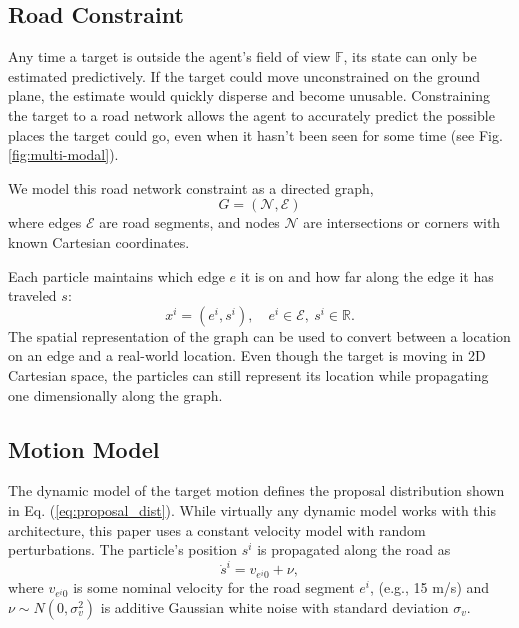 \documentclass[letterpaper, 10 pt, conference]{ieeeconf}  %
\begin{document}
\subsection{Road Constraint}

Any time a target is outside the agent's field of view $\mathbb{F}$, its state can only be estimated predictively. If the target could move unconstrained on the ground plane, the estimate would quickly disperse and become unusable. Constraining the target to a road network allows the agent to accurately predict the possible places the target could go, even when it hasn't been seen for some time (see Fig. \ref{fig:multi-modal}).

We model this road network constraint as a directed graph,
\begin{equation}%
    G = (\mathcal{N}, \mathcal{E})
\end{equation}
where edges $\mathcal{E}$ are road segments, and nodes $\mathcal{N}$ are intersections or corners with known Cartesian coordinates.

Each particle maintains which edge $e$ it is on and how far along the edge it has traveled $s$:
\begin{equation}%
    x^i = (e^i, s^i), \quad e^i \in \mathcal{E},\ s^i \in \mathbb{R}.
\end{equation}
The spatial representation of the graph can be used to convert between a location on an edge and a real-world location. Even though the target is moving in 2D Cartesian space, the particles can still represent its location while propagating one dimensionally along the graph.

\subsection{Motion Model}

The dynamic model of the target motion defines the proposal distribution shown in Eq. (\ref{eq:proposal_dist}). While virtually any dynamic model works with this architecture, this paper uses a constant velocity model with random perturbations. The particle's position $s^i$ is propagated along the road as
\begin{equation}%
    \dot{s}^i = v_{e^{i}0} + \nu,
\end{equation}
where $v_{e^{i}0}$ is some nominal velocity for the road segment $e^i$, (e.g., 15 m/s) and $\nu \sim N(0, \sigma_v^2)$ is additive Gaussian white noise with standard deviation $\sigma_v$.
\end{document}
